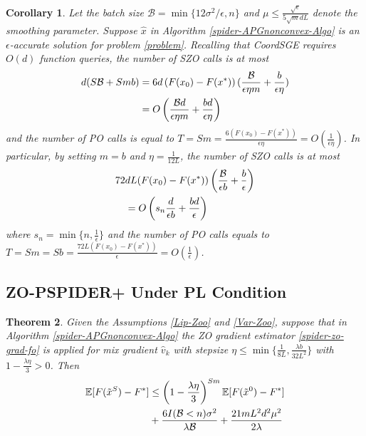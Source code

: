 \documentclass[iicol,sn-basic]{sn-jnl}
\theoremstyle{thmstyleone}%
\newtheorem{theorem}{Theorem}%
\theoremstyle{thmstyletwo}%
\theoremstyle{thmstylethree}%
\newcommand*{\E}{\mathbb{E}}
\newtheorem{corollary}[theorem]{Corollary}
\begin{document}
 \begin{corollary}\label{spider-corr11}
Let the batch size $\mathcal{B} = \min\{12\sigma^2/\epsilon, n\}$ and $\mu \leq \frac{\sqrt{\epsilon}}{5{\sqrt{m}dL}}$ denote the smoothing parameter. Suppose $\hat{x}$ in Algorithm \ref{spider-APGnonconvex-Algo} is an $\epsilon$-accurate solution for problem \eqref{problem}. Recalling that CoordSGE requires $O(d)$ function queries, the number of SZO calls is at most 
\begin{align}
d(S\mathcal{B}+Smb) &= 6d \left(F(x_0) - F({x}^*)\right) (\frac{\mathcal{B}}{\epsilon\eta m}+\frac{b}{\epsilon\eta})\notag\\
& = O\left(\frac{\mathcal{B}d}{\epsilon\eta m}+\frac{bd}{\epsilon\eta}\right)\label{spider-SZO-call-nocon}
\end{align}
and the number of PO calls is equal to $T = Sm = \frac{6\left(F(x_0) - F({x}^*)\right)}{\epsilon\eta} = O\left(\frac{1}{\epsilon\eta}\right)$. In particular, by setting $m=b$ and $\eta = \frac{1}{12L}$, the number of SZO calls is at most 
\begin{align}
72&d L (F(x_0)-F(x^*))\left(\frac{\mathcal{B}}{\epsilon b}+\frac{b}{\epsilon}\right)\notag\\
& = O\left(s_n\frac{d}{\epsilon b}+\frac{bd}{\epsilon}\right)\label{spider-SZO-call-par-nocon}
\end{align}
where $s_n = \min\{n,\frac{1}{\epsilon}\}$ and the number of PO calls equals to $T = Sm = S b = \frac{72 L \left(F(x_0) - F({x}^*)\right)}{\epsilon} = O\left(\frac{1}{\epsilon}\right)$. 
\end{corollary}

\subsection{ZO-PSPIDER+ Under PL Condition}

\begin{theorem}\label{spider-PL-Zoo}
Given the Assumptions \ref{Lip-Zoo} and \ref{Var-Zoo}, suppose that in Algorithm \ref{spider-APGnonconvex-Algo} the ZO gradient estimator \eqref{spider-zo-grad-fo} is applied for mix gradient $\hat{v}_k$ with stepsize $\eta \leq \min\{\frac{1}{8L}, \frac{\lambda b}{32 L^2}\}$ with $1 - \frac{\lambda\eta}{3} > 0$. Then 
\begin{align}
\E[F(\tilde{x}^S) - {F}^*] & \leq   \left(1-\frac{\lambda\eta}{3}\right)^{Sm} \E[F(\tilde{x}^0) - {F}^*]\notag\\
& + \frac{6I(\mathcal{B} < n) \sigma ^2}{\lambda \mathcal{B}}+\frac{21  m L^2 d^2 \mu^2}{2\lambda}\label{spider-PL-eq-error}
\end{align}
\end{theorem}
\end{document}
